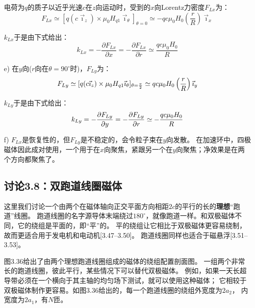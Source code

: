 电荷为$q$的质子以近乎光速$c$在$z$向运动时，受到的$x$向Lorentz力密度$F_{Lx}$为：
\begin{equation}
F_{Lx}\simeq[q(c\vec{\imath}_{z})\times\mu_{0}H_{q1}\vec{\imath}_{\theta}]_{\theta=0}
\simeq-qc\mu_{0}H_{0}\left(\frac{r}{R}\right)\vec{\imath}_{x}%
\end{equation}

$k_{Lx}$于是由下式给出：
\begin{equation}
k_{Lx}=-\frac{\partial F_{Lx}}{\partial x}=-\frac{\partial F_{Lx}}{\partial r}
\simeq \frac{qc\mu_{0}H_{0}}{R}%
\end{equation}

e) 在$y$向($r$向在$\theta=90^\circ$时)，$F_{Ly}$为：
\begin{equation}
F_{Ly}\simeq[q(c\vec{\imath}_{z})\times\mu_{0}H_{q1}\vec{\imath}_{\theta}]_{\theta=\frac{\pi}{2}}
\simeq qc\mu_{0}H_{0}\left(\frac{r}{R}\right)\vec{\imath}_{y}\\%
\end{equation}

$k_{Ly}$于是由下式给出：
\begin{equation}
k_{Ly}=-\frac{\partial F_{Ly}}{\partial y}=-\frac{\partial F_{Ly}}{\partial r}
\simeq-\frac{qc \mu_{0}H_{0}}{R}\\%
\end{equation}

f) $F_{Lx}$是恢复性的，但$F_{Ly}$是不稳定的，会令粒子束在$y$向发散。
在加速环中，四极磁体因此成对使用，一个用于在$x$向聚焦，紧跟另一个在$y$向聚焦；净效果是在两个方向都聚焦了。
\newpage



\subsection{讨论3.8：双跑道线圈磁体}
这里我们讨论一个由两个在磁体轴向正交平面方向相距$2c$的平行的长的\textbf{理想}“跑道”线圈。
跑道线圈的名字源导体末端绕过$180^\circ$，就像跑道一样。和双极磁体不同，它的绕组是平面的，即“平”的。
平的绕组让它相比于双极磁体更容易绕制，故而更适合用于发电机和电动机[3.47–3.50]。
跑道线圈同样也适合于磁悬浮[3.51–3.53]。

图3.36给出了由两个理想跑道线圈组成的磁体的绕组配置剖面图。
一组两个非常长的跑道线圈，彼此平行，某些情况下可以替代双极磁体。
例如，如果一天长超导带必须在一个横向于其主轴的均匀场下测试，就可以使用这种磁体；
它相较于双极磁体制作更容易。如图3.36给出的，每一个跑道线圈的绕组外宽度为$2a_2$，
内宽度为$2a_1$，有$N$匝。

